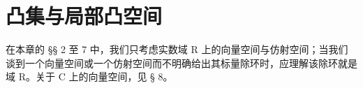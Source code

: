 \chapter{凸集与局部凸空间}

在本章的 §§ 2 至 7 中，我们只考虑实数域 R 上的向量空间与仿射空间；当我们谈到一个向量空间或一个仿射空间而不明确给出其标量除环时，应理解该除环就是域 R。关于 C 上的向量空间，见 § 8。

